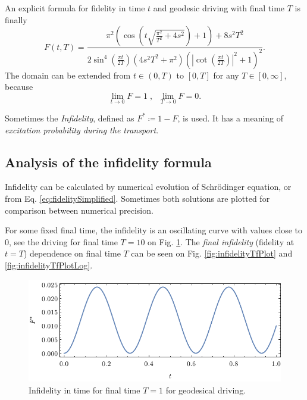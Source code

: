 An explicit formula for fidelity in time $t$ and geodesic driving with final time $T$ is finally
\begin{equation}
    F(t,T)=\frac{\pi ^2 \left(\cos \left(t \sqrt{\frac{\pi ^2}{T^2}+4 s^2}\right)+1\right)+8 s^2 T^2}{2 \sin ^4\left(\frac{\pi  t}{2 T}\right) \left(4 s^2 T^2+\pi ^2\right) \left(\left| \cot \left(\frac{\pi  t}{2 T}\right)\right|^2+1\right)^2}.
    \label{eq:fidelitySimplified}
\end{equation}
The domain can be extended from $t\in(0,T)$ to $[0,T]$ for any $T\in[0,\infty]$, because 
$$
    \lim_{t\rightarrow 0}F=1\; ,\;\; \lim_{T\rightarrow 0}F=0.
$$

Sometimes the \emph{Infidelity}, defined as $F^*\coloneqq 1-F$, is used. It has a meaning of \emph{excitation probability during the transport}.


\subsection{Analysis of the infidelity formula}
Infidelity can be calculated by numerical evolution of Schr\"odinger equation, or from Eq. \ref{eq:fidelitySimplified}. Sometimes both solutions are plotted for comparison between numerical precision. 

For some fixed final time, the infidelity is an oscillating curve with values close to $0$, see the driving for final time $T=10$ on Fig. \ref{fig:infidelityTimePlot}. The \emph{final infidelity} (fidelity at $t=T$) dependence on final time $T$ can be seen on Fig. \ref{fig:infidelityTfPlot} and \ref{fig:infidelityTfPlotLog}.
\begin{figure}[H]
    \centering
    \includegraphics[scale=1.2]{../img/infidelityTimePlotGeod.pdf}
    \caption{Infidelity in time for final time $T=1$ for geodesical driving.}
  \label{fig:infidelityTimePlot}
\end{figure}

